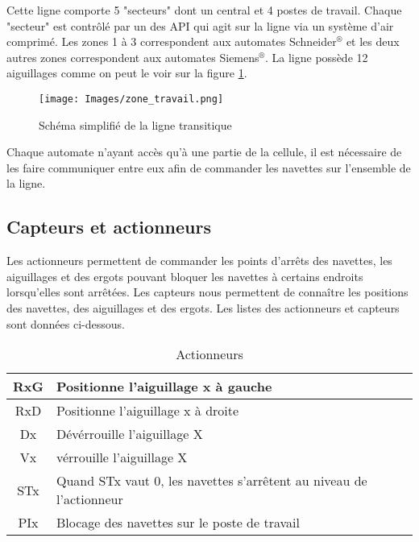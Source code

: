 \documentclass[a4paper,french, titlepage]{book}
\begin{document}
Cette ligne comporte 5 "secteurs" dont un central et 4 postes de travail. Chaque "secteur" est contrôlé par un des API qui agit sur la ligne via un système d'air comprimé. Les zones 1 à 3 correspondent aux automates Schneider$^{\circledR}$ et les deux autres zones correspondent aux automates Siemens$^{\circledR}$. La ligne possède 12 aiguillages comme on peut le voir sur la figure \ref{Les zones de travail}.

\begin{figure}[H] 
\begin{center}
\texttt{[image: Images/zone\_travail.png]} 
\end{center}
\caption{Schéma simplifié de la ligne transitique}
\label{Les zones de travail}
\end{figure} 

Chaque automate n'ayant accès qu'à une partie de la cellule, il est nécessaire de les faire communiquer entre eux afin de commander les navettes sur l'ensemble de la ligne.\\

\newpage
\subsection{Capteurs et actionneurs}

Les actionneurs permettent de commander les points d'arrêts des navettes, les aiguillages et des ergots pouvant bloquer les navettes à certains endroits lorsqu'elles sont arrêtées. Les capteurs nous permettent de connaître les positions des navettes, des aiguillages et des ergots. Les listes des actionneurs et capteurs sont données ci-dessous.

\begin{table}[H]

 
\begin{center}
\begin{tabular}{|c||l|}
	\hline RxG   & Positionne l'aiguillage x à gauche  \\
	\hline RxD   & Positionne l'aiguillage x à droite  \\
	\hline Dx    & Dévérrouille l'aiguillage X          \\
	\hline Vx    & vérrouille l'aiguillage X            \\
	\hline STx   & Quand STx vaut 0, les navettes s'arrêtent au niveau de l'actionneur \\
	\hline PIx    & Blocage des navettes sur le poste de travail \\
	\hline
\end{tabular}     
\end{center}
\caption{\label{tab:actionneurs}Actionneurs}
\end{table}
\
\end{document}
